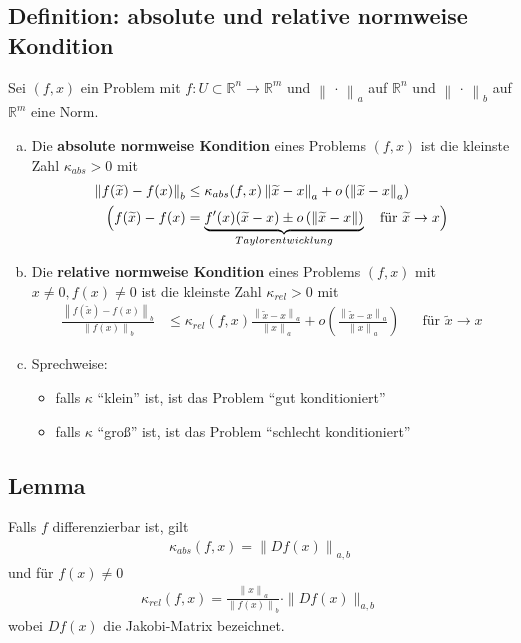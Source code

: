 \documentclass[ngerman,fontsize=11pt, paper=a4, parskip=half, titlepage=true, toc=bib]{scrbook}
\newcommand{\R}{\mathds{R}}
\newcommand{\nn}[1]{\left\| #1 \right\|}
\begin{document}
\subsection{Definition: absolute und relative normweise Kondition}
Sei $(f,x)$ ein Problem mit $f:U\subset \R^n \rightarrow \R^m$
und $\nn{\,\cdot\,}_a$ auf $\R^n$ und $\nn{\,\cdot\,}_b$ auf $\R^m$ eine Norm.
\begin{enumerate}[a)]
	\item Die \textbf{absolute normweise Kondition} eines Problems $(f,x)$ ist die kleinste Zahl 
			 $\kappa _{abs} > 0 $ mit
			 \begin{align}
			 	\nn{f(\widetilde{x})-f(x)}_b &\leq \kappa _{abs}(f,x) \nn{\widetilde{x}-x}_a
			 	+ o\left(\nn{\widetilde{x}-x}_a\right) \label{III.2.2} \\\nonumber
			 	\Bigl(f(\widetilde{x})- f(x) 
						 	&=\underbrace{ f'(x)(\widetilde{x}-x)\pm o\left(\nn{\widetilde{x}-x}\right)}_{Taylorentwicklung}
							 \quad \text{für }\widetilde{x}\rightarrow x 
						 	\Bigr)
			 \end{align}
	\item Die \textbf{relative normweise Kondition} eines Problems $(f,x)$  mit $x\neq 0, f(x) \neq 0$
			 	ist die kleinste Zahl 
			 	$\kappa _{rel} > 0 $ mit
			 	\begin{align}
			 \frac{	\nn{f(\widetilde{x})-f(x)}_b }{\nn{f(x)}_b}
				 &\leq \kappa _{rel}(f,x)\frac{ \nn{\widetilde{x}-x}_a}{\nn{x}_a}
			 	+ 
			 	o\left(\frac{\nn{\widetilde{x}-x}_a}{\nn{x}_a}\right) \label{III.2.3}
					 &&	\text{für } \widetilde{x} \rightarrow x
			 	\end{align}
	\item Sprechweise:
		\begin{itemize}
			\item falls $\kappa$ \enquote{klein} ist, ist das Problem \enquote{gut konditioniert}
			\item falls $\kappa$ \enquote{groß} ist, ist das Problem \enquote{schlecht konditioniert}
		\end{itemize}
\end{enumerate}

\subsection{Lemma} \label{3.2.8}
Falls $f$ differenzierbar ist, gilt
\begin{gather}
	\kappa_{abs}(f,x) = \nn{Df(x)}_{a,b} \label{III.2.4}
\end{gather}
und für $f(x) \neq 0$
\begin{gather}
	\kappa_{rel}(f,x) = \frac{\nn{x}_a}{\nn{f(x)}_b}\cdot \|Df(x)\|_{a,b} \label{III.2.5}
\end{gather}
wobei $Df(x)$ die Jakobi-Matrix bezeichnet.
%
\end{document}
